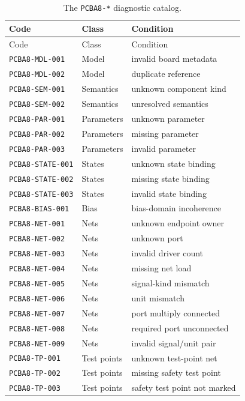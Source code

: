 \begin{longtable}{@{}lll@{}}
\caption{The \texttt{PCBA8-*} diagnostic catalog.}\label{appA:codetable}\\
\toprule
Code & Class & Condition \\
\midrule
\endfirsthead
\toprule
Code & Class & Condition \\
\midrule
\endhead
\bottomrule
\endfoot
\texttt{PCBA8-MDL-001} & Model & invalid board metadata \\
\texttt{PCBA8-MDL-002} & Model & duplicate reference \\
\texttt{PCBA8-SEM-001} & Semantics & unknown component kind \\
\texttt{PCBA8-SEM-002} & Semantics & unresolved semantics \\
\texttt{PCBA8-PAR-001} & Parameters & unknown parameter \\
\texttt{PCBA8-PAR-002} & Parameters & missing parameter \\
\texttt{PCBA8-PAR-003} & Parameters & invalid parameter \\
\texttt{PCBA8-STATE-001} & States & unknown state binding \\
\texttt{PCBA8-STATE-002} & States & missing state binding \\
\texttt{PCBA8-STATE-003} & States & invalid state binding \\
\texttt{PCBA8-BIAS-001} & Bias & bias-domain incoherence \\
\texttt{PCBA8-NET-001} & Nets & unknown endpoint owner \\
\texttt{PCBA8-NET-002} & Nets & unknown port \\
\texttt{PCBA8-NET-003} & Nets & invalid driver count \\
\texttt{PCBA8-NET-004} & Nets & missing net load \\
\texttt{PCBA8-NET-005} & Nets & signal-kind mismatch \\
\texttt{PCBA8-NET-006} & Nets & unit mismatch \\
\texttt{PCBA8-NET-007} & Nets & port multiply connected \\
\texttt{PCBA8-NET-008} & Nets & required port unconnected \\
\texttt{PCBA8-NET-009} & Nets & invalid signal/unit pair \\
\texttt{PCBA8-TP-001} & Test points & unknown test-point net \\
\texttt{PCBA8-TP-002} & Test points & missing safety test point \\
\texttt{PCBA8-TP-003} & Test points & safety test point not marked \\

\end{longtable}
